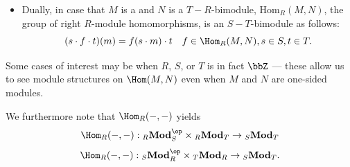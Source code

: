 \begin{definition}
\begin{itemize}
        \item Dually, in case that $M$ is a  and $N$ is a $T-R$-bimodule, $\mathrm{Hom}_R(M, N)$, the group of right $R$-module homomorphisms, is an $S-T$-bimodule as follows:
        $$(s\cdot f\cdot t)(m) = f(s \cdot m) \cdot t \quad f \in \Hom_R(M,N), s \in S, t \in T.$$
    \end{itemize}
    Some cases of interest may be when $R$, $S$, or $T$ is in fact $\bbZ$ --- these allow us to see module structures on $\Hom(M,N)$ even when $M$ and $N$ are one-sided modules.

    We furthermore note that $\Hom_R(-,-)$ yields 
    $$\Hom_R(-,-): {}_R \mathbf{Mod}_{S}^{\op} \times {}_{R} \mathbf{Mod}_{T} \to {}_{S} \mathbf{Mod}_{T}$$
    $$\Hom_R(-,-): {}_S \mathbf{Mod}_{R}^{\op} \times {}_{T} \mathbf{Mod}_{R} \to {}_{S} \mathbf{Mod}_{T}.$$
     
\end{definition}